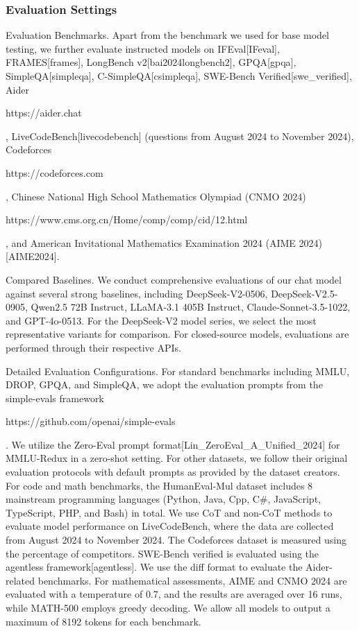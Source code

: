 \documentclass[11pt,a4paper]{article}
\begin{document}
\subsubsection{Evaluation Settings}

Evaluation Benchmarks. Apart from the benchmark we used for base model testing, we further evaluate instructed models on IFEval[IFeval], FRAMES[frames], LongBench v2[bai2024longbench2], GPQA[gpqa], SimpleQA[simpleqa], C-SimpleQA[csimpleqa], SWE-Bench Verified[swe\_verified], Aider

https://aider.chat

, LiveCodeBench[livecodebench] (questions from August 2024 to November 2024), Codeforces

https://codeforces.com

, Chinese National High School Mathematics Olympiad (CNMO 2024)

https://www.cms.org.cn/Home/comp/comp/cid/12.html

, and American Invitational Mathematics Examination 2024 (AIME 2024)[AIME2024].

Compared Baselines. We conduct comprehensive evaluations of our chat model against several strong baselines, including DeepSeek-V2-0506, DeepSeek-V2.5-0905, Qwen2.5 72B Instruct, LLaMA-3.1 405B Instruct, Claude-Sonnet-3.5-1022, and GPT-4o-0513. For the DeepSeek-V2 model series, we select the most representative variants for comparison. For closed-source models, evaluations are performed through their respective APIs.

Detailed Evaluation Configurations. For standard benchmarks including MMLU, DROP, GPQA, and SimpleQA, we adopt the evaluation prompts from the simple-evals framework

https://github.com/openai/simple-evals

. We utilize the Zero-Eval prompt format[Lin\_ZeroEval\_A\_Unified\_2024] for MMLU-Redux in a zero-shot setting. For other datasets, we follow their original evaluation protocols with default prompts as provided by the dataset creators. For code and math benchmarks, the HumanEval-Mul dataset includes 8 mainstream programming languages (Python, Java, Cpp, C\#, JavaScript, TypeScript, PHP, and Bash) in total. We use CoT and non-CoT methods to evaluate model performance on LiveCodeBench, where the data are collected from August 2024 to November 2024. The Codeforces dataset is measured using the percentage of competitors. SWE-Bench verified is evaluated using the agentless framework[agentless]. We use the diff format to evaluate the Aider-related benchmarks. For mathematical assessments, AIME and CNMO 2024 are evaluated with a temperature of 0.7, and the results are averaged over 16 runs, while MATH-500 employs greedy decoding. We allow all models to output a maximum of 8192 tokens for each benchmark.
\end{document}
